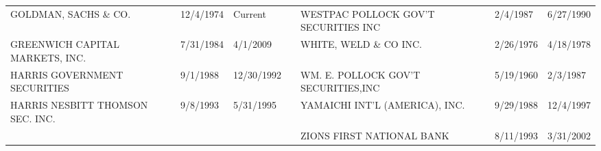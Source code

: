 \begin{tabular}{lllllll}
GOLDMAN, SACHS \& CO.                & 12/4/1974 & Current &  & WESTPAC POLLOCK GOV'T SECURITIES INC & 2/4/1987 & 6/27/1990 \\
GREENWICH CAPITAL MARKETS, INC.      & 7/31/1984 & 4/1/2009 &  & WHITE, WELD \& CO INC.                & 2/26/1976 & 4/18/1978 \\
HARRIS GOVERNMENT SECURITIES        & 9/1/1988 & 12/30/1992 &  & WM. E. POLLOCK GOV'T SECURITIES,INC  & 5/19/1960 & 2/3/1987 \\
HARRIS NESBITT THOMSON SEC. INC.    & 9/8/1993 & 5/31/1995 &  & YAMAICHI INT'L (AMERICA), INC.      & 9/29/1988 & 12/4/1997 \\
 &  &  &  & ZIONS FIRST NATIONAL BANK            & 8/11/1993 & 3/31/2002 \\
\bottomrule
\end{tabular}
